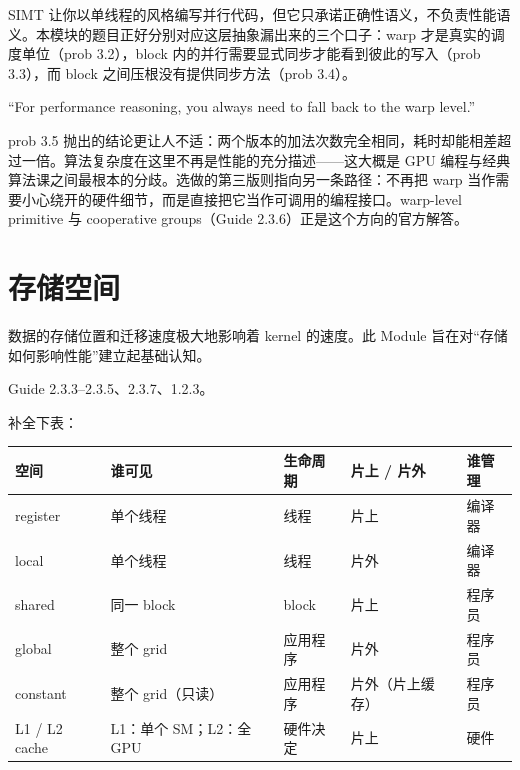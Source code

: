 \documentclass[11pt,a4paper,fontset=none]{ctexart}
\begin{document}
\begin{lookback}
  SIMT 让你以单线程的风格编写并行代码，但它只承诺正确性语义，不负责性能语义。本模块的题目正好分别对应这层抽象漏出来的三个口子：warp 才是真实的调度单位（prob 3.2），block 内的并行需要显式同步才能看到彼此的写入（prob 3.3），而 block 之间压根没有提供同步方法（prob 3.4）。

  ``For performance reasoning, you always need to fall back to the warp level.''

  prob 3.5 抛出的结论更让人不适：两个版本的加法次数完全相同，耗时却能相差超过一倍。算法复杂度在这里不再是性能的充分描述——这大概是 GPU 编程与经典算法课之间最根本的分歧。选做的第三版则指向另一条路径：不再把 warp 当作需要小心绕开的硬件细节，而是直接把它当作可调用的编程接口。warp-level primitive 与 cooperative groups（Guide 2.3.6）正是这个方向的官方解答。
\end{lookback}

\section{存储空间}

数据的存储位置和迁移速度极大地影响着 kernel 的速度。此 Module 旨在对“存储如何影响性能”建立起基础认知。

\begin{reading}
  Guide 2.3.3--2.3.5、2.3.7、1.2.3。
\end{reading}

补全下表：

\begin{center}\small
  \begin{tabular}{@{}lp{8em}p{7em}p{6em}p{8em}@{}}
    \toprule
    空间            & 谁可见               & 生命周期  & 片上 / 片外  & 谁管理 \\
    \midrule
    register      & 单个线程              & 线程    & 片上       & 编译器 \\
    local         & 单个线程              & 线程    & 片外       & 编译器 \\
    shared        & 同一 block          & block & 片上       & 程序员 \\
    global        & 整个 grid           & 应用程序  & 片外       & 程序员 \\
    constant      & 整个 grid（只读）       & 应用程序  & 片外（片上缓存） & 程序员 \\
    L1 / L2 cache & L1：单个 SM；L2：全 GPU & 硬件决定  & 片上       & 硬件  \\
    \bottomrule
  \end{tabular}
\end{center}
\end{document}
